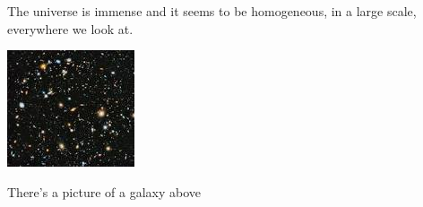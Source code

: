 \documentclass{article}
\begin{document}
The universe is immense and it seems to be homogeneous,
in a large scale, everywhere we look at.

\includegraphics{universe}

There's a picture of a galaxy above
\end{document}

